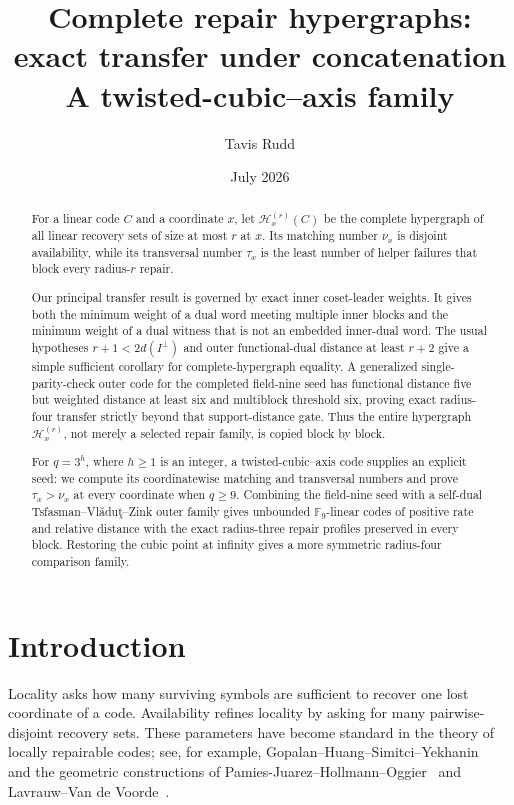 \documentclass[11pt]{article}
\title{Complete repair hypergraphs: exact transfer under concatenation\\
\large A twisted-cubic--axis family}
\author{Tavis Rudd}
\date{July 2026}
\theoremstyle{definition}
\theoremstyle{remark}
\newcommand{\F}{\mathbb{F}}
\newcommand{\cH}{\mathcal{H}}
\begin{document}
\maketitle

\begin{abstract}
For a linear code $C$ and a coordinate $x$, let $\cH_x^{(r)}(C)$ be the
complete hypergraph of all linear recovery sets of size at most $r$ at $x$.
Its matching number $\nu_x$ is disjoint availability, while its transversal
number $\tau_x$ is the least number of helper failures that block every
radius-$r$ repair.

Our principal transfer result is governed by exact inner coset-leader
weights.  It gives both the minimum weight of a dual word meeting multiple
inner blocks and the minimum weight of a dual witness that is not an embedded
inner-dual word.
The usual hypotheses $r+1<2d(I^\perp)$ and outer functional-dual distance at
least $r+2$ give a simple sufficient corollary for complete-hypergraph
equality.  A generalized single-parity-check outer
code for the completed field-nine seed has functional distance five but
weighted distance at least six and multiblock threshold six, proving exact
radius-four transfer strictly beyond that support-distance gate.  Thus the
entire hypergraph $\cH_x^{(r)}$, not
merely a selected repair family, is copied block by block.

For $q=3^h$, where $h\geq1$ is an integer, a twisted-cubic--axis code supplies
an explicit seed: we compute
its coordinatewise matching and transversal numbers and prove
$\tau_x>\nu_x$ at every coordinate when $q\geq9$.  Combining the field-nine
seed with a self-dual Tsfasman--Vl\u{a}du\c{t}--Zink outer family gives
unbounded $\F_9$-linear codes of positive rate and relative distance with
the exact radius-three repair profiles preserved in every block.  Restoring
the cubic point at infinity gives a more symmetric radius-four comparison
family.
\end{abstract}

\section{Introduction}

Locality asks how many surviving symbols are sufficient to recover one lost
coordinate of a code.  Availability refines locality by asking for many
pairwise-disjoint recovery sets.  These parameters have become standard in
the theory of locally repairable codes; see, for example,
Gopalan--Huang--Simitci--Yekhanin~\cite{GopalanEtAl2012} and the geometric
constructions of Pamies-Juarez--Hollmann--Oggier~\cite{PamiesEtAl2013} and
Lavrauw--Van de Voorde~\cite{LavrauwVanDeVoorde2019}.
\end{document}
